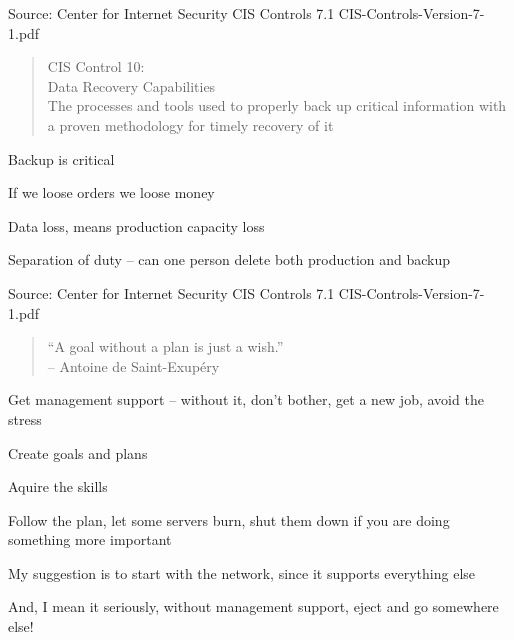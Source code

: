 \documentclass[Screen16to9,17pt]{foils}
\begin{document}
Source: Center for Internet Security CIS Controls 7.1 CIS-Controls-Version-7-1.pdf



\begin{quote}
CIS Control 10:\\
Data Recovery Capabilities\\
The processes and tools used to properly back up critical information with a proven methodology
for timely recovery of it
\end{quote}

\begin{list1}
\item Backup is critical
\item If we loose orders we loose money
\item Data loss, means production capacity loss
\item Separation of duty -- can one person delete both production and backup
\end{list1}

Source: Center for Internet Security CIS Controls 7.1 CIS-Controls-Version-7-1.pdf



\begin{quote}
  “A goal without a plan is just a wish.”\\
  -- Antoine de Saint-Exupéry
\end{quote}

\begin{list2}
\item Get management support -- without it, don't bother, get a new job, avoid the stress
\item Create goals and plans
\item Aquire the skills
\item Follow the plan, let some servers burn, shut them down if you are doing something more important
\item My suggestion is to start with the network, since it supports everything else
\end{list2}

And, I mean it seriously, without management support, eject and go somewhere else!


\end{document}
